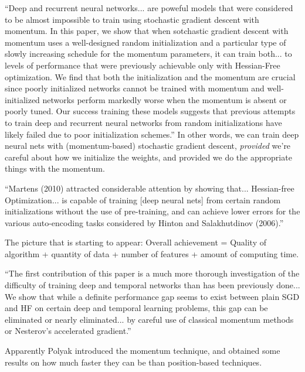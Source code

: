 \documentclass[12pt]{report}
\begin{document}
``Deep and recurrent neural networks... are poweful models that were
considered to be almost impossible to train using stochastic gradient
descent with momentum.  In this paper, we show that when sotchastic
gradient descent with momentum uses a well-designed random
initialization and a particular type of slowly increasing schedule for
the momentum parameters, it can train both... to levels of performance
that were previously achievable only with Hessian-Free optimization.
We find that both the initialization and the momentum are crucial
since poorly initialized networks cannot be trained with momentum and
well-initialized networks perform markedly worse when the momentum is
absent or poorly tuned.  Our success training these models suggests
that previous attempts to train deep and recurrent neural networks
from random initializations have likely failed due to poor
initialization schemes.''  In other words, we can train deep neural
nets with (momentum-based) stochastic gradient descent,
\emph{provided} we're careful about how we initialize the weights, and
provided we do the appropriate things with the momentum.

``Martens (2010) attracted considerable attention by showing
that... Hessian-free Optimization... is capable of training [deep
neural nets] from certain random initializations without the use of
pre-training, and can achieve lower errors for the various
auto-encoding tasks considered by Hinton and Salakhutdinov (2006).''

The picture that is starting to appear: Overall achievement = Quality
of algorithm + quantity of data + number of features + amount of
computing time.

``The first contribution of this paper is a much more thorough
investigation of the difficulty of training deep and temporal networks
than has been previously done... We show that while a definite
performance gap seems to exist between plain SGD and HF on certain
deep and temporal learning problems, this gap can be eliminated or
nearly eliminated... by careful use of classical momentum methods or
Nesterov's accelerated gradient.''

Apparently Polyak introduced the momentum technique, and obtained some
results on how much faster they can be than position-based techniques.
\end{document}
